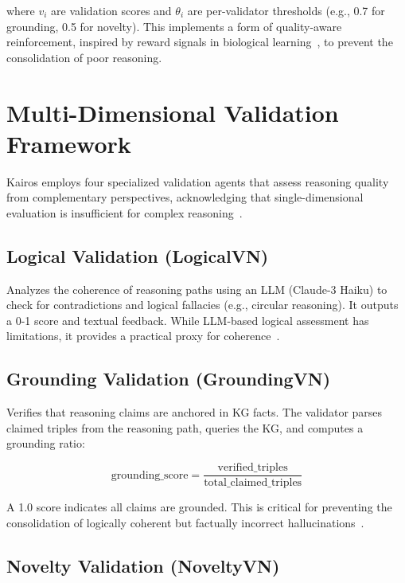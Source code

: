 \documentclass{article}
\begin{document}
where $v_i$ are validation scores and $\theta_i$ are per-validator thresholds (e.g., 0.7 for grounding, 0.5 for novelty). This implements a form of quality-aware reinforcement, inspired by reward signals in biological learning~\citep{squire2015memory}, to prevent the consolidation of poor reasoning.

\section{Multi-Dimensional Validation Framework}
\label{sec:validation}

Kairos employs four specialized validation agents that assess reasoning quality from complementary perspectives, acknowledging that single-dimensional evaluation is insufficient for complex reasoning~\citep{park2023generative,xu2025amem}.

\subsection{Logical Validation (LogicalVN)}

Analyzes the coherence of reasoning paths using an LLM (Claude-3 Haiku) to check for contradictions and logical fallacies (e.g., circular reasoning). It outputs a 0-1 score and textual feedback. While LLM-based logical assessment has limitations, it provides a practical proxy for coherence~\citep{pan2024unifying}.

\subsection{Grounding Validation (GroundingVN)}

Verifies that reasoning claims are anchored in KG facts. The validator parses claimed triples from the reasoning path, queries the KG, and computes a grounding ratio:

\begin{equation}
\text{grounding\_score} = \frac{\text{verified\_triples}}{\text{total\_claimed\_triples}}
\end{equation}

A 1.0 score indicates all claims are grounded. This is critical for preventing the consolidation of logically coherent but factually incorrect hallucinations~\citep{edge2024graphrag}.

\subsection{Novelty Validation (NoveltyVN)}
\end{document}
